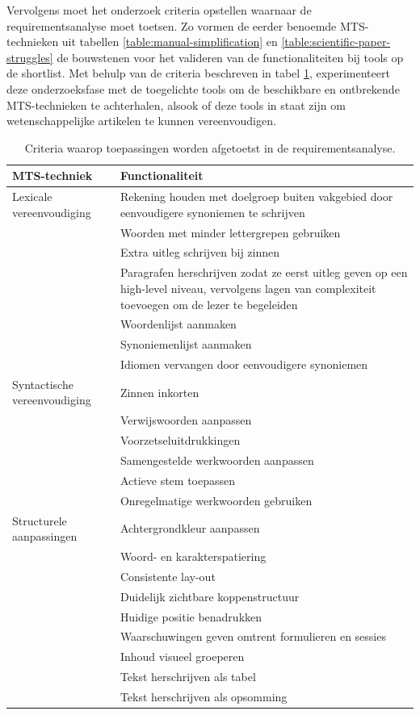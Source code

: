 Vervolgens moet het onderzoek criteria opstellen waarnaar de requirementsanalyse moet toetsen. Zo vormen de eerder benoemde MTS-technieken uit tabellen \ref{table:manual-simplification} en \ref{table:scientific-paper-struggles} de bouwstenen voor het valideren van de functionaliteiten bij tools op de shortlist. Met behulp van de criteria beschreven in tabel \ref{table:criteria-requirementsanalysis}, experimenteert deze onderzoeksfase met de toegelichte tools om de beschikbare en ontbrekende MTS-technieken te achterhalen, alsook of deze tools in staat zijn om wetenschappelijke artikelen te kunnen vereenvoudigen.

\begin{center}
	\begin{table}[H]
		\begin{tabular}{ | m{4cm} | m{11cm} | } 
			\hline
			\textbf{MTS-techniek} & \textbf{Functionaliteit} \\
			\hline
			Lexicale vereenvoudiging & Rekening houden met doelgroep buiten vakgebied door eenvoudigere synoniemen te schrijven \\
			& Woorden met minder lettergrepen gebruiken \\
			& Extra uitleg schrijven bij zinnen \\
			& Paragrafen herschrijven zodat ze eerst uitleg geven op een high-level niveau, vervolgens lagen van complexiteit toevoegen om de lezer te begeleiden \\
			& Woordenlijst aanmaken \\
			& Synoniemenlijst aanmaken \\
			& Idiomen vervangen door eenvoudigere synoniemen \\
			\hline
			Syntactische vereenvoudiging & Zinnen inkorten \\
			& Verwijswoorden aanpassen \\
			& Voorzetseluitdrukkingen \\
			& Samengestelde werkwoorden aanpassen \\
			& Actieve stem toepassen \\
			& Onregelmatige werkwoorden gebruiken \\
			\hline
			Structurele aanpassingen & Achtergrondkleur aanpassen \\
			& Woord- en karakterspatiering \\
			& Consistente lay-out \\
			& Duidelijk zichtbare koppenstructuur \\
			& Huidige positie benadrukken \\
			& Waarschuwingen geven omtrent formulieren en sessies \\
			& Inhoud visueel groeperen \\
			& Tekst herschrijven als tabel \\
			& Tekst herschrijven als opsomming \\
			\hline
		\end{tabular}
		\caption{Criteria waarop toepassingen worden afgetoetst in de requirementsanalyse.}
		\label{table:criteria-requirementsanalysis}	
	\end{table}
\end{center}

